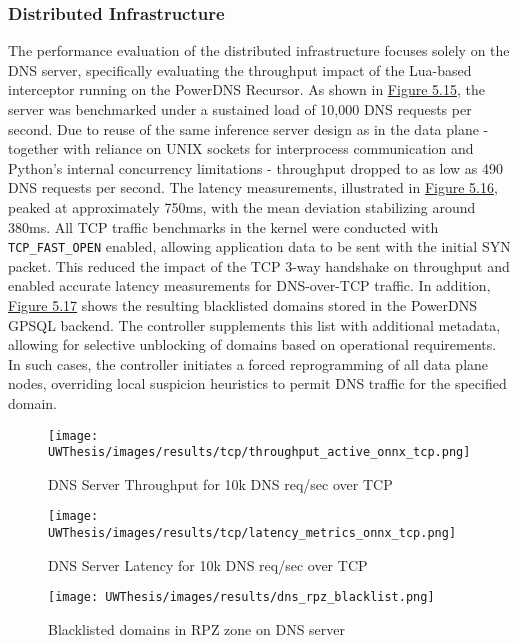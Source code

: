 \documentclass [11pt, proquest] {uwthesis}[2020/02/24]
\begin{document}
\subsubsection{Distributed Infrastructure}
The performance evaluation of the distributed infrastructure focuses solely on the DNS server, specifically evaluating the throughput impact of the Lua-based interceptor running on the PowerDNS Recursor. As shown in \hyperref[fig:throughput_gsld_tcp]{Figure 5.15}, the server was benchmarked under a sustained load of 10,000 DNS requests per second. Due to reuse of the same inference server design as in the data plane - together with reliance on UNIX sockets for interprocess communication and Python’s internal concurrency limitations - throughput dropped to as low as 490 DNS requests per second. The latency measurements, illustrated in \hyperref[fig:throughput_onnx_tcp]{Figure 5.16}, peaked at approximately 750ms, with the mean deviation stabilizing around 380ms.
All TCP traffic benchmarks in the kernel were conducted with \texttt{TCP\_FAST\_OPEN} enabled, allowing application data to be sent with the initial SYN packet. This reduced the impact of the TCP 3-way handshake on throughput and enabled accurate latency measurements for DNS-over-TCP traffic.
In addition, \hyperref[fig:dns_rpz]{Figure 5.17} shows the resulting blacklisted domains stored in the PowerDNS GPSQL backend. The controller supplements this list with additional metadata, allowing for selective unblocking of domains based on operational requirements. In such cases, the controller initiates a forced reprogramming of all data plane nodes, overriding local suspicion heuristics to permit DNS traffic for the specified domain.



\begin{figure}[H]
  \centering
  \texttt{[image: UWThesis/images/results/tcp/throughput\_active\_onnx\_tcp.png]}
  \caption{DNS Server Throughput for 10k DNS req/sec over TCP}
  \label{fig:throughput_gsld_tcp}
\end{figure}

\begin{figure}[H]
  \centering
  \texttt{[image: UWThesis/images/results/tcp/latency\_metrics\_onnx\_tcp.png]}
  \caption{DNS Server Latency for 10k DNS req/sec over TCP}
  \label{fig:throughput_onnx_tcp}
\end{figure}



\begin{figure}[H]
  \texttt{[image: UWThesis/images/results/dns\_rpz\_blacklist.png]}
\caption{Blacklisted domains in RPZ zone on DNS server}
  \label{fig:dns_rpz}
\end{figure}
\end{document}
